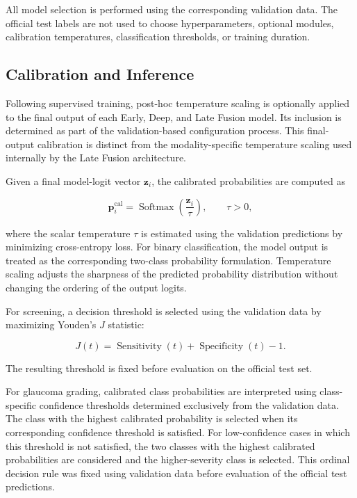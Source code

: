 \documentclass[preprint,12pt]{elsarticle}
\begin{document}
All model selection is performed using the corresponding validation data. The official test labels are not used to choose hyperparameters, optional modules, calibration temperatures, classification thresholds, or training duration.

\subsection{Calibration and Inference}
\label{subsec:calibration_inference}

Following supervised training, post-hoc temperature scaling is optionally applied to the final output of each Early, Deep, and Late Fusion model. Its inclusion is determined as part of the validation-based configuration process. This final-output calibration is distinct from the modality-specific temperature scaling used internally by the Late Fusion architecture.

Given a final model-logit vector $\mathbf{z}_{i}$, the calibrated probabilities are computed as

\begin{equation}
    \mathbf{p}_{i}^{\mathrm{cal}}
    =
    \operatorname{Softmax}
    \left(
    \frac{\mathbf{z}_{i}}{\tau}
    \right),
    \qquad
    \tau>0,
    \label{eq:posthoc_temperature}
\end{equation}

where the scalar temperature $\tau$ is estimated using the validation predictions by minimizing cross-entropy loss. For binary classification, the model output is treated as the corresponding two-class probability formulation. Temperature scaling adjusts the sharpness of the predicted probability distribution without changing the ordering of the output logits.

For screening, a decision threshold is selected using the validation data by maximizing Youden's $J$ statistic:

\begin{equation}
    J(t)
    =
    \operatorname{Sensitivity}(t)
    +
    \operatorname{Specificity}(t)
    -1.
    \label{eq:youden}
\end{equation}

The resulting threshold is fixed before evaluation on the official test set.

For glaucoma grading, calibrated class probabilities are interpreted using class-specific confidence thresholds determined exclusively from the validation data. The class with the highest calibrated probability is selected when its corresponding confidence threshold is satisfied. For low-confidence cases in which this threshold is not satisfied, the two classes with the highest calibrated probabilities are considered and the higher-severity class is selected. This ordinal decision rule was fixed using validation data before evaluation of the official test predictions.
\end{document}
